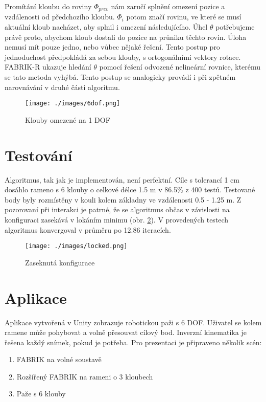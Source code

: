 \documentclass[czech]{pyt-report}
\begin{document}
Promítání kloubu do roviny $\Phi_{prev}$ nám zaručí splnění omezení pozice a vzdálenosti od předchozího kloubu. $\Phi_{i}$ potom značí rovinu, ve které se musí aktuální kloub nacházet, aby splnil i omezení následujícího. Úhel $\theta$ potřebujeme právě proto, abychom kloub dostali do pozice na průniku těchto rovin. Úloha nemusí mít pouze jedno, nebo vůbec nějaké řešení. Tento postup pro jednoduchost předpokládá za sebou klouby, s ortogonálními vektory rotace. FABRIK-R\cite{bib:fabrik-r} ukazuje hledání $\theta$ pomocí řešení odvozené nelineární rovnice, kterému se tato metoda vyhýbá. Tento postup se analogicky provádí i při zpětném narovnávání v druhé části algoritmu.

\begin{figure}[h]
  \centering\leavevmode
  \texttt{[image: ./images/6dof.png]}\vskip-0.5cm
  \medskip
  \caption{Klouby omezené na 1 DOF}
  \label{fig:constrained-system}
\end{figure}

\section{Testování}
\label{sec:testovani}
Algoritmus, tak jak je implementován, není perfektní. Cíle s tolerancí 1 cm dosáhlo rameno s 6 klouby o celkové délce 1.5 m v 86.5\% z 400 testů. Testované body byly rozmístěny v kouli kolem základny ve vzdálenosti 0.5 - 1.25 m. Z pozorovaní při interakci je patrné, že se algoritmus občas v závislosti na konfiguraci zasekává v lokáním minimu (obr. \ref{fig:locked-configuration}). V provedených testech algoritmus konvergoval v průměru po 12.86 iteracích.

\begin{figure}[h]
  \centering\leavevmode
  \texttt{[image: ./images/locked.png]}\vskip-0.5cm
  \medskip
  \caption{Zaseknutá konfigurace}
  \label{fig:locked-configuration}
\end{figure}

\section{Aplikace}
\label{sec:aplikace}
Aplikace vytvořená v Unity\cite{bib:unity} zobrazuje robotickou paži s 6 DOF. Uživatel se kolem ramene může pohybovat a volně přesouvat cílový bod. Inverzní kinematika je řešena každý snímek, pokud je potřeba. Pro prezentaci je připraveno několik scén:
\begin{enumerate}
  \item FABRIK na volné soustavě
  \item Rozšířený FABRIK na rameni o 3 kloubech
  \item Paže s 6 klouby
\end{enumerate}
\end{document}
